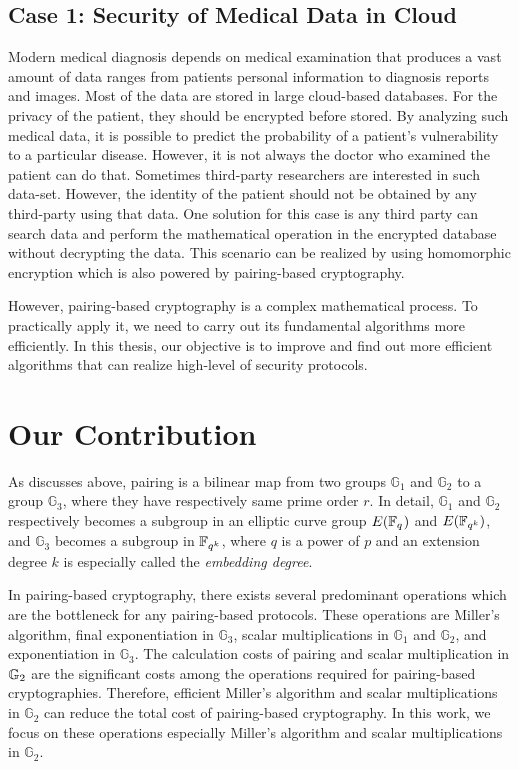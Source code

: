 \subsection*{Case 1: Security of Medical Data in Cloud}
Modern medical diagnosis depends on medical examination that produces a vast amount of data ranges from patients personal information to diagnosis reports and images.
Most of the data are stored in large cloud-based databases. 
For the privacy of the patient, they should be encrypted before stored.
By analyzing such medical data, it is possible to predict the probability of a patient's vulnerability to a particular disease. 
However, it is not always the doctor who examined the patient can do that.
Sometimes third-party researchers are interested in such data-set. 
However, the identity of the patient should not be obtained by any third-party using that data. 
One solution for this case is any third party can search data and perform the mathematical operation in the encrypted database without decrypting the data.
This scenario can be realized by using homomorphic encryption which is also powered by pairing-based cryptography.

However, pairing-based cryptography is a complex mathematical process.
To practically apply it, we need to carry out its fundamental algorithms more efficiently.
In this thesis, our objective is to improve and find out more efficient algorithms that can realize high-level of security protocols.

\section{Our Contribution}
\label{ch1_sec_contribution}
As discusses above, pairing is a bilinear map from two groups $\mathbb{G}_1$ and $\mathbb{G}_2$ to a group $\mathbb{G}_3$, where they have respectively same prime order $r$.
In detail, $\mathbb{G}_1$ and $\mathbb{G}_2$ respectively becomes a subgroup in an elliptic curve group $E({\mathbb{F}}_{q^{}})$ and $E({\mathbb{F}}_{q^{k}})$, and $\mathbb{G}_3$ becomes a subgroup in ${\mathbb{F}}_{q^{k}}$, where $q$ is a power of $p$ and an extension degree $k$ is especially called the {\it embedding degree}.

In pairing-based cryptography, there exists several predominant operations which are the bottleneck for any pairing-based protocols.
These operations are Miller's algorithm, final exponentiation in $\mathbb{G}_3$, scalar multiplications in $\mathbb{G}_1$ and $\mathbb{G}_2$, and exponentiation in $\mathbb{G}_3$.
The calculation costs of pairing and scalar multiplication in ${\mathbb{G}}_{2}$ are the significant costs among the operations required for pairing-based cryptographies.
Therefore, efficient Miller's algorithm and scalar multiplications in $\mathbb{G}_2$ can reduce the total cost of pairing-based cryptography.
In this work, we focus on these operations especially Miller's algorithm and scalar multiplications in $\mathbb{G}_2$.
	
